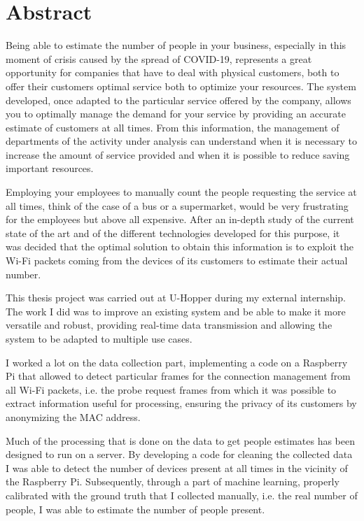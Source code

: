 \chapter*{Abstract} %
\label{abstract}

\vspace{0.4 cm} 

Being able to estimate the number of people in your business, especially in this moment of crisis caused by the spread of COVID-19, represents a great opportunity for companies that have to deal with physical customers, both to offer their customers optimal service both to optimize your resources. The system developed, once adapted to the particular service offered by the company, allows you to optimally manage the demand for your service by providing an accurate estimate of customers at all times. From this information, the management of departments of the activity under analysis can understand when it is necessary to increase the amount of service provided and when it is possible to reduce saving important resources.

Employing your employees to manually count the people requesting the service at all times, think of the case of a bus or a supermarket, would be very frustrating for the employees but above all expensive. After an in-depth study of the current state of the art and of the different technologies developed for this purpose, it was decided that the optimal solution to obtain this information is to exploit the Wi-Fi packets coming from the devices of its customers to estimate their actual number.

This thesis project was carried out at U-Hopper during my external internship. The work I did was to improve an existing system and be able to make it more versatile and robust, providing real-time data transmission and allowing the system to be adapted to multiple use cases.

I worked a lot on the data collection part, implementing a code on a Raspberry Pi that allowed to detect particular frames for the connection management from all Wi-Fi packets, i.e. the probe request frames from which it was possible to extract information useful for processing, ensuring the privacy of its customers by anonymizing the MAC address.

Much of the processing that is done on the data to get people estimates has been designed to run on a server. By developing a code for cleaning the collected data I was able to detect the number of devices present at all times in the vicinity of the Raspberry Pi. Subsequently, through a part of machine learning, properly calibrated with the ground truth that I collected manually, i.e. the real number of people, I was able to estimate the number of people present.

